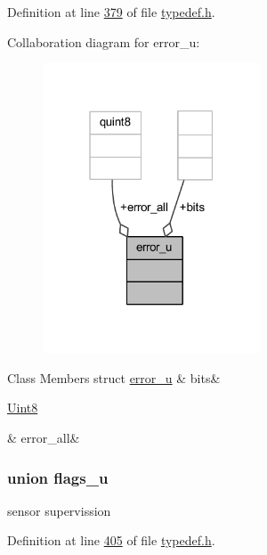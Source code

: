 Definition at line \hyperlink{a00001_source_l00379}{379} of file \hyperlink{a00001_source}{typedef.\+h}.



Collaboration diagram for error\+\_\+u\+:
\nopagebreak
\begin{figure}[H]
\begin{center}
\leavevmode
\includegraphics[width=183pt]{d6/d82/a00243}
\end{center}
\end{figure}
\begin{DoxyFields}{Class Members}
\hypertarget{a00001_ab7fa541f8ea77e6dcc68f5c4a396ec4e}{struct \hyperlink{a00001_d2/db1/a00070}{error\+\_\+u}}\label{a00001_ab7fa541f8ea77e6dcc68f5c4a396ec4e}
&
bits&
\\
\hline

\hypertarget{a00001_a5a1595d8eaf32825fc6cd8f7d5504231}{\hyperlink{a00001_a979e3e23b9a449e69ab6a8a83b6042f8}{Uint8}}\label{a00001_a5a1595d8eaf32825fc6cd8f7d5504231}
&
error\+\_\+all&
\\
\hline

\end{DoxyFields}
\label{db/db6/a00074}
\hypertarget{a00001_db/db6/a00074}{}
\subsubsection{union flags\+\_\+u}
sensor supervission 

Definition at line \hyperlink{a00001_source_l00405}{405} of file \hyperlink{a00001_source}{typedef.\+h}.



